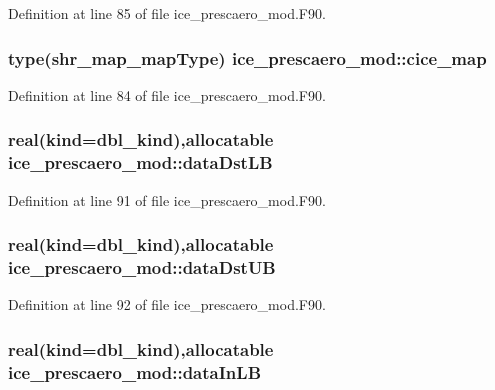 Definition at line 85 of file ice\_\-prescaero\_\-mod.F90.\hypertarget{namespaceice__prescaero__mod_a4975c089616e76a62c08619dc3e4fd8a}{
\subsubsection[{cice\_\-map}]{\setlength{\rightskip}{0pt plus 5cm}type(shr\_\-map\_\-mapType) {\bf ice\_\-prescaero\_\-mod::cice\_\-map}}}
\label{namespaceice__prescaero__mod_a4975c089616e76a62c08619dc3e4fd8a}


Definition at line 84 of file ice\_\-prescaero\_\-mod.F90.\hypertarget{namespaceice__prescaero__mod_a7b35ab67e4a9bc5affef31d7a418c8cc}{
\subsubsection[{dataDstLB}]{\setlength{\rightskip}{0pt plus 5cm}real(kind=dbl\_\-kind),allocatable {\bf ice\_\-prescaero\_\-mod::dataDstLB}}}
\label{namespaceice__prescaero__mod_a7b35ab67e4a9bc5affef31d7a418c8cc}


Definition at line 91 of file ice\_\-prescaero\_\-mod.F90.\hypertarget{namespaceice__prescaero__mod_aaafab7a06140832287cfb2357f553967}{
\subsubsection[{dataDstUB}]{\setlength{\rightskip}{0pt plus 5cm}real(kind=dbl\_\-kind),allocatable {\bf ice\_\-prescaero\_\-mod::dataDstUB}}}
\label{namespaceice__prescaero__mod_aaafab7a06140832287cfb2357f553967}


Definition at line 92 of file ice\_\-prescaero\_\-mod.F90.\hypertarget{namespaceice__prescaero__mod_a7ef634010a6c0d07c52a41321fce88d6}{
\subsubsection[{dataInLB}]{\setlength{\rightskip}{0pt plus 5cm}real(kind=dbl\_\-kind),allocatable {\bf ice\_\-prescaero\_\-mod::dataInLB}}}
\label{namespaceice__prescaero__mod_a7ef634010a6c0d07c52a41321fce88d6}


